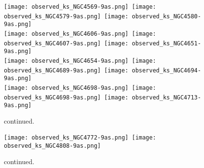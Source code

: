 \documentclass[longauth]{aa}
\begin{document}
\begin{appendix}
\renewcommand\thefigure{\thesection.\arabic{figure}}
\setcounter{figure}{0}

\begin{figure*}
\texttt{[image: observed\_ks\_NGC4569-9as.png]}\,
\texttt{[image: observed\_ks\_NGC4579-9as.png]}\,
\texttt{[image: observed\_ks\_NGC4580-9as.png]}\\

\texttt{[image: observed\_ks\_NGC4606-9as.png]}\,
\texttt{[image: observed\_ks\_NGC4607-9as.png]}\,
\texttt{[image: observed\_ks\_NGC4651-9as.png]}\\

\texttt{[image: observed\_ks\_NGC4654-9as.png]}\,
\texttt{[image: observed\_ks\_NGC4689-9as.png]}\,
\texttt{[image: observed\_ks\_NGC4694-9as.png]}\\

\texttt{[image: observed\_ks\_NGC4698-9as.png]}\,
\texttt{[image: observed\_ks\_NGC4698-9as.png]}\,
\texttt{[image: observed\_ks\_NGC4713-9as.png]}\\

\caption{continued.}
\end{figure*}

\renewcommand\thefigure{\thesection.\arabic{figure}}
\setcounter{figure}{0}

\begin{figure*}
\texttt{[image: observed\_ks\_NGC4772-9as.png]}\,
\texttt{[image: observed\_ks\_NGC4808-9as.png]}\\
\caption{continued.}
\end{figure*}

\end{appendix}



 
\end{document}
